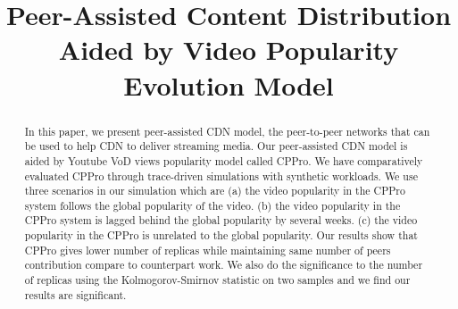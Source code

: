 \documentclass[10pt,final,journal,a4paper]{IEEEtran}
\begin{document}
%
\title{Peer-Assisted Content Distribution Aided by Video Popularity Evolution Model}

\author{
 \quad
{}
}








\maketitle


\begin{abstract}
In this paper, we present peer-assisted CDN model, the peer-to-peer networks that can be used to help CDN to deliver streaming media.
Our peer-assisted CDN model is aided by Youtube VoD views popularity model called CPPro.
We have comparatively evaluated CPPro through trace-driven simulations with synthetic workloads.
We use three scenarios in our simulation which are 
(a) the video popularity in the CPPro system follows the global popularity of the video.
(b) the video popularity in the CPPro system is lagged behind the global popularity by several weeks.
(c) the video popularity in the CPPro is unrelated to the global popularity.
Our results show that CPPro gives lower number of replicas while maintaining same number of peers contribution compare to counterpart work. 
We also do the significance to the number of replicas using the Kolmogorov-Smirnov statistic on two samples and we find our results are significant.%

\end{abstract}
\end{document}

